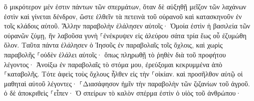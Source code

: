\documentclass{openreader}
\begin{document}
ὃ μικρότερον μέν ἐστιν πάντων τῶν σπερμάτων, ὅταν δὲ αὐξηθῇ μεῖζον τῶν λαχάνων ἐστὶν καὶ γίνεται δένδρον, ὥστε ἐλθεῖν τὰ πετεινὰ τοῦ οὐρανοῦ καὶ κατασκηνοῦν ἐν τοῖς κλάδοις αὐτοῦ. 
Ἄλλην παραβολὴν ἐλάλησεν αὐτοῖς· Ὁμοία ἐστὶν ἡ βασιλεία τῶν οὐρανῶν ζύμῃ, ἣν λαβοῦσα γυνὴ ⸀ἐνέκρυψεν εἰς ἀλεύρου σάτα τρία ἕως οὗ ἐζυμώθη ὅλον. 
Ταῦτα πάντα ἐλάλησεν ὁ Ἰησοῦς ἐν παραβολαῖς τοῖς ὄχλοις, καὶ χωρὶς παραβολῆς ⸀οὐδὲν ἐλάλει αὐτοῖς· 
ὅπως πληρωθῇ τὸ ῥηθὲν διὰ τοῦ προφήτου λέγοντος· Ἀνοίξω ἐν παραβολαῖς τὸ στόμα μου, ἐρεύξομαι κεκρυμμένα ἀπὸ ⸀καταβολῆς. 
Τότε ἀφεὶς τοὺς ὄχλους ἦλθεν εἰς τὴν ⸀οἰκίαν. καὶ προσῆλθον αὐτῷ οἱ μαθηταὶ αὐτοῦ λέγοντες· ⸀Διασάφησον ἡμῖν τὴν παραβολὴν τῶν ζιζανίων τοῦ ἀγροῦ. 
ὁ δὲ ἀποκριθεὶς ⸀εἶπεν· Ὁ σπείρων τὸ καλὸν σπέρμα ἐστὶν ὁ υἱὸς τοῦ ἀνθρώπου· 
\end{document}
